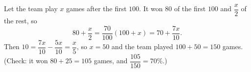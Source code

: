Let the team play $x$ games after the first $100$. It won $80$ of the first $100$ and $\dfrac{x}{2}$ of the rest, so
\[
80+\dfrac{x}{2}=\dfrac{70}{100}(100+x)=70+\dfrac{7x}{10}.
\]
Then $10=\dfrac{7x}{10}-\dfrac{5x}{10}=\dfrac{x}{5}$, so $x=50$ and the team played $100+50=\boxed{150}$ games. (Check: it won $80+25=105$ games, and $\dfrac{105}{150}=70\%$.)
